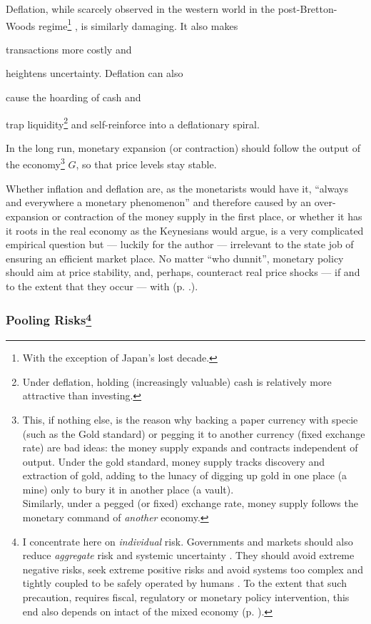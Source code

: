 Deflation, while scarcely observed in the western world in the post-Bretton-Woods regime\footnote{
	With the exception of Japan's lost decade.}%
, is similarly damaging. It also makes \begin{inparaenum}[\itshape 1\upshape)]
	\item transactions more costly and 
	\item heightens uncertainty. Deflation can also 
	\item cause the hoarding of cash and 
	\item trap liquidity\footnote{
		Under deflation, holding (increasingly valuable) cash is relatively more attractive than investing.} 
	and self-reinforce into a deflationary spiral.
	\end{inparaenum}

In the long run, monetary expansion (or contraction) should follow the output of the economy\footnote{
	This, if nothing else, is the reason why backing a paper currency with specie (such as the Gold standard) or pegging it to another currency (fixed exchange rate) are bad ideas: the money supply expands and contracts independent of output. Under the gold standard, money supply tracks discovery and extraction of gold, adding to the lunacy of digging up gold in one place (a mine) only to bury it in another place (a vault). \\ 
	Similarly, under a pegged (or fixed) exchange rate, money supply follows the monetary command of \emph{another} economy.} 
$G$, so that price levels stay stable.

Whether inflation and deflation are, as the monetarists would have it, ``always and everywhere a monetary phenomenon'' \citep{Friedman1970} %
and therefore caused by an over-expansion or contraction of the money supply in the first place, or whether it has it roots in the real economy as the Keynesians would argue, is a very complicated empirical question but --- luckily for the author --- irrelevant to the state job of ensuring an efficient market place. No matter ``who dunnit'', monetary policy should aim at price stability, and, perhaps, counteract real price shocks --- if and to the extent that they occur --- with  (p. \pageref{sec:monetary-stimulus}.).%

\subsubsection[Pooling Risks]{Pooling Risks\footnote{
	I concentrate here on \emph{individual} risk. Governments and markets should also reduce \emph{aggregate} risk and systemic uncertainty \citep{Knight1921}. They should avoid extreme negative risks, seek extreme positive risks \citep{Taleb2007} and avoid systems too complex and tightly coupled to be safely operated by humans \citep{Perrow-1999-aa}. To the extent that such precaution, requires fiscal, regulatory or monetary policy intervention, this end also depends on intact  of the mixed economy (p. \pageref{sec:means}).}}
	\label{sec:risk}

